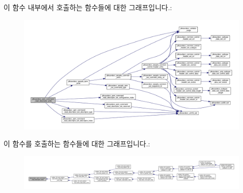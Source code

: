 이 함수 내부에서 호출하는 함수들에 대한 그래프입니다.\+:
\nopagebreak
\begin{figure}[H]
\begin{center}
\leavevmode
\includegraphics[width=350pt]{group__command__read__descriptor_gade3ca50a535aaef541561a6ea62d2ca0_cgraph}
\end{center}
\end{figure}




이 함수를 호출하는 함수들에 대한 그래프입니다.\+:
\nopagebreak
\begin{figure}[H]
\begin{center}
\leavevmode
\includegraphics[width=350pt]{group__command__read__descriptor_gade3ca50a535aaef541561a6ea62d2ca0_icgraph}
\end{center}
\end{figure}


